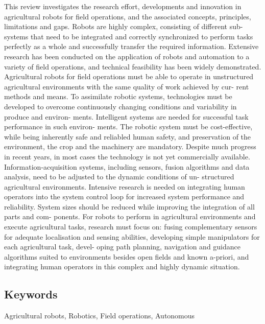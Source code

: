     This review investigates the research effort, developments and innovation in agricultural
    robots for field operations, and the associated concepts, principles, limitations and gaps.
    Robots are highly complex, consisting of different sub-systems that need to be integrated
    and correctly synchronized to perform tasks perfectly as a whole and successfully transfer
    the required information. Extensive research has been conducted on the application of
    robots and automation to a variety of field operations, and technical feasibility has been
    widely demonstrated. Agricultural robots for field operations must be able to operate in
    unstructured agricultural environments with the same quality of work achieved by cur-
    rent methods and means. To assimilate robotic systems, technologies must be developed
    to overcome continuously changing conditions and variability in produce and environ-
    ments. Intelligent systems are needed for successful task performance in such environ-
    ments. The robotic system must be cost-effective, while being inherently safe and
    reliabled human safety, and preservation of the environment, the crop and the machinery
    are mandatory. Despite much progress in recent years, in most cases the technology is not
    yet commercially available. Information-acquisition systems, including sensors, fusion
    algorithms and data analysis, need to be adjusted to the dynamic conditions of un-
    structured agricultural environments. Intensive research is needed on integrating human
    operators into the system control loop for increased system performance and reliability.
    System sizes should be reduced while improving the integration of all parts and com-
    ponents. For robots to perform in agricultural environments and execute agricultural
    tasks, research must focus on: fusing complementary sensors for adequate localisation
    and sensing abilities, developing simple manipulators for each agricultural task, devel-
    oping path planning, navigation and guidance algorithms suited to environments besides
    open fields and known a-priori, and integrating human operators in this complex and
    highly dynamic situation.
    
    
    \subsection*{Keywords}
    Agricultural robots, Robotics, Field operations, Autonomous
    
    
     
